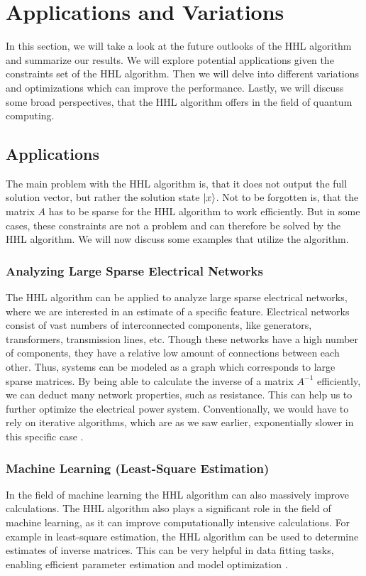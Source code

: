 \section{Applications and Variations} 
In this section, we will take a look at the future outlooks of the HHL algorithm and summarize our results.
We will explore potential applications given the constraints set of the HHL algorithm.
Then we will delve into different variations and optimizations which can improve the performance. 
Lastly, we will discuss some broad perspectives, that the HHL algorithm offers in the field of quantum computing. 

\subsection{Applications}
The main problem with the HHL algorithm is, that it does not output the full solution vector, but rather the solution state $\ket x$.
Not to be forgotten is, that the matrix $A$ has to be sparse for the HHL algorithm to work efficiently.
But in some cases, these constraints are not a problem and can therefore be solved by the HHL algorithm.
We will now discuss some examples that utilize the algorithm. 

    \subsubsection{Analyzing Large Sparse Electrical Networks}
    The HHL algorithm can be applied to analyze large sparse electrical networks, where we are interested in an estimate of a specific feature.
    Electrical networks consist of vast numbers of interconnected components, like generators, transformers, transmission lines, etc. 
    Though these networks have a high number of components, they have a relative low amount of connections between each other.
    Thus, systems can be modeled as a graph which corresponds to large sparse matrices.
    By being able to calculate the inverse of a matrix $A^{-1}$ efficiently, we can deduct many network properties, such as resistance. 
    This can help us to further optimize the electrical power system.
    Conventionally, we would have to rely on iterative algorithms, which are as we saw earlier, exponentially slower in this specific case \cite{electrical_networks}.
    
    \subsubsection{Machine Learning (Least-Square Estimation)}
    In the field of machine learning the HHL algorithm can also massively improve calculations. 
    The HHL algorithm also plays a significant role in the field of machine learning, as it can improve computationally intensive calculations.
    For example in least-square estimation, the HHL algorithm can be used to determine estimates of inverse matrices. 
    This can be very helpful in data fitting tasks, enabling efficient parameter estimation and model optimization \cite{data_fitting}.
    
